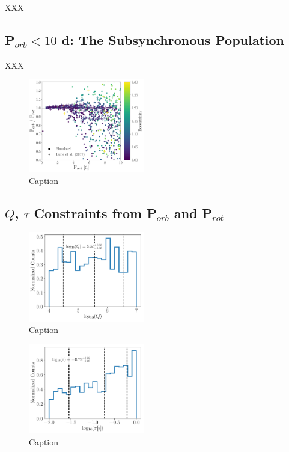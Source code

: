 \documentclass[twocolumn]{aastex61}
\begin{document}
XXX

\subsection{P$_{orb} < 10$ d: The Subsynchronous Population} \label{sec:subsync}

XXX

\begin{figure}
	\includegraphics[width=0.45\textwidth]{../Plots/subsync.pdf}
   \caption{Caption}%
    \label{fig:subsync}%
\end{figure}

\subsection{$Q$, $\tau$ Constraints from P$_{orb}$ and P$_{rot}$} \label{sec:qTau}

\begin{figure}
	\includegraphics[width=0.45\textwidth]{../Plots/qLurie.pdf}
   \caption{Caption}%
    \label{fig:qLurie}%
\end{figure}

\begin{figure}
	\includegraphics[width=0.45\textwidth]{../Plots/tauLurie.pdf}
   \caption{Caption}%
    \label{fig:tauLurie}%
\end{figure}
\end{document}
